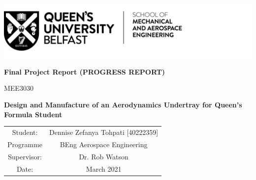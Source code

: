 \begin{titlepage}
\includegraphics[scale=1]{Figures/QUB LOGO - SMAE.png}
\centering

\vspace{4cm}
\textbf{Final Project Report (PROGRESS REPORT)}

MEE3030

\vspace{3cm}
\textbf{Design and Manufacture of an Aerodynamics Undertray for Queen's Formula Student}


\vspace{7cm}
\begin{tabular}{cc}
    Student: &  \quad Dennise Zefanya Tohpati [40222359]\\
    Programme & \quad BEng Aerospace Engineering\\
    Supervisor: & \quad Dr. Rob Watson\\
    Date: & \quad 29 March 2021
    
    
\end{tabular}
\end{titlepage}
